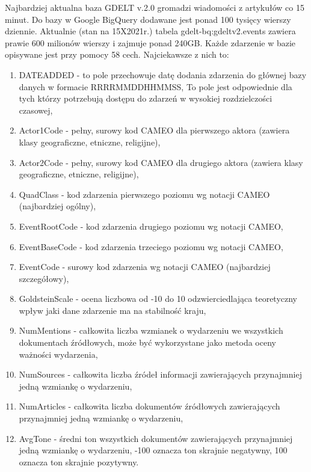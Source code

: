 \documentclass[11pt]{report}
\begin{document}
    Najbardziej aktualna baza GDELT v.\@ 2.0 gromadzi wiadomości z artykułów co 15 minut.
    Do bazy w Google BigQuery dodawane jest ponad 100 tysięcy wierszy dziennie.
    Aktualnie (stan na 15X2021r.) tabela gdelt-bq:gdeltv2.events zawiera prawie 600 milionów wierszy
    i zajmuje ponad 240GB\@.
    Każde zdarzenie w bazie opisywane jest przy pomocy 58 cech.
    Najciekawsze z nich to:
    \begin{enumerate}
        \item DATEADDED - to pole przechowuje datę dodania zdarzenia do głównej bazy danych w formacie RRRRMMDDHHMMSS,
        To pole jest odpowiednie dla tych którzy potrzebują dostępu do zdarzeń w wysokiej rozdzielczości czasowej,
        \item Actor1Code - pełny, surowy kod CAMEO dla pierwszego aktora (zawiera klasy geograficzne, etniczne, religijne),
        \item Actor2Code - pełny, surowy kod CAMEO dla drugiego aktora (zawiera klasy geograficzne, etniczne, religijne),
        \item QuadClass - kod zdarzenia pierwszego poziomu wg notacji CAMEO (najbardziej ogólny),
        \item EventRootCode - kod zdarzenia drugiego poziomu wg notacji CAMEO,
        \item EventBaseCode - kod zdarzenia trzeciego poziomu wg notacji CAMEO,
        \item EventCode - surowy kod zdarzenia wg notacji CAMEO (najbardziej szczegółowy),
        \item GoldsteinScale - ocena liczbowa od -10 do 10 odzwierciedlająca teoretyczny wpływ jaki dane zdarzenie ma na stabilność kraju,
        \item NumMentions - całkowita liczba wzmianek o wydarzeniu we wszystkich dokumentach źródłowych,
        może być wykorzystane jako metoda oceny ważności wydarzenia,
        \item NumSources - całkowita liczba źródeł informacji zawierających przynajmniej jedną wzmiankę o wydarzeniu,
        \item NumArticles - całkowita liczba dokumentów źródłowych zawierających przynajmniej jedną wzmiankę o wydarzeniu,
        \item AvgTone - średni ton wszystkich dokumentów zawierających przynajmniej jedną wzmiankę o wydarzeniu,
        -100 oznacza ton skrajnie negatywny, 100 oznacza ton skrajnie pozytywny.
    \end{enumerate}
\end{document}
